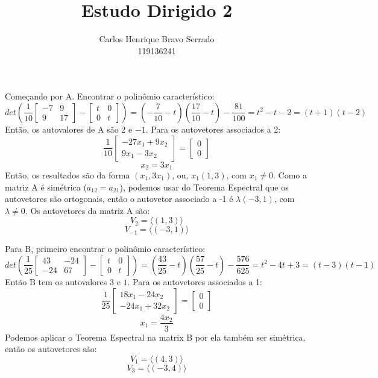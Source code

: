 \documentclass{homework}
\title{Estudo Dirigido 2}
\author{Carlos Henrique Bravo Serrado\\ 119136241}
\begin{document}
\maketitle

\exercise*
Começando por A. Encontrar o polinômio característico:
\[det \left( \frac{1}{10}
\begin{bmatrix}
-7 & 9\\
9 & 17
\end{bmatrix} - 
\begin{bmatrix}
t & 0\\
0 & t
\end{bmatrix}\right) = \left(-\frac{7}{10}-t\right)\left(\frac{17}{10}-t\right)-\frac{81}{100}
= t^2 - t - 2 = (t+1)(t-2)\]
Então, os autovalores de A são $2$ e $-1$. Para os autovetores associados a 2:
\[\frac{1}{10}\begin{bmatrix}
-27x_1 + 9x_2\\
9x_1 - 3x_2
\end{bmatrix} = \begin{bmatrix}
0 \\
0
\end{bmatrix}\]
\[x_2 = 3x_1\]
Então, os resultados são da forma $(x_1,3x_1)$, ou, $x_1(1,3)$, com $x_1 \neq 0$. Como a matriz A é simétrica ($a_{12} = a_{21}$), podemos usar do Teorema Espectral que os autovetores são ortogonais, então o autovetor associado a -1 é $\lambda(-3,1)$, com $\lambda \neq 0$. Os autovetores da matriz A são:
\[V_2 = \langle(1,3)\rangle\]
\[V_{-1} = \langle(-3,1)\rangle\]

Para B, primeiro encontrar o polinômio característico:
\[det \left( \frac{1}{25}
\begin{bmatrix}
43 & -24\\
-24 & 67
\end{bmatrix} - 
\begin{bmatrix}
t & 0\\
0 & t
\end{bmatrix}\right) = \left(\frac{43}{25}-t\right)\left(\frac{57}{25}-t\right)-\frac{576}{625}
= t^2 - 4t + 3 = (t-3)(t-1)\]
Então B tem os autovalores $3$ e $1$. Para os autovetores associados a 1:
\[\frac{1}{25}\begin{bmatrix}
18x_1 -24x_2\\
-24x_1 + 32x_2
\end{bmatrix} = \begin{bmatrix}
0 \\
0
\end{bmatrix}\]
\[x_1 = \frac{4x_2}{3}\]
Podemos aplicar o Teorema Espectral na matrix B por ela também ser simétrica, então os autovetores são:
\[V_1 = \langle(4,3)\rangle\]
\[V_3 = \langle(-3,4)\rangle\]
\end{document}
